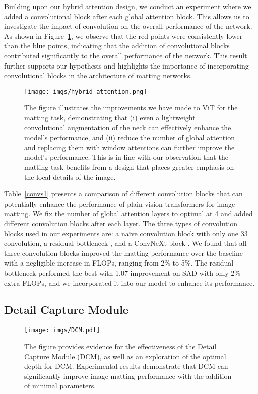 \documentclass[10pt,twocolumn,letterpaper]{article}
\begin{document}
Building upon our hybrid attention design, we conduct an experiment where we added a convolutional block after each global attention block. This allows us to investigate the impact of convolution on the overall performance of the network. As shown in Figure~\ref{fig:hybrid_attention}, we observe that the red points were consistently lower than the blue points, indicating that the addition of convolutional blocks contributed significantly to the overall performance of the network. This result further supports our hypothesis and highlights the importance of incorporating convolutional blocks in the architecture of matting networks.

\begin{figure}
    \centering
    \texttt{[image: imgs/hybrid\_attention.png]}
    \caption{The figure illustrates the improvements we have made to ViT for the matting task, demonstrating that (i) even a lightweight convolutional augmentation of the neck can effectively enhance the model's performance, and (ii) reduce the number of global attention and replacing them with window attentions can further improve the model's performance. This is in line with our observation that the matting task benefits from a design that places greater emphasis on the local details of the image. }
    \label{fig:hybrid_attention}
\end{figure}

Table~\ref{convs1} presents a comparison of different convolution blocks that can potentially enhance the performance of plain vision transformers for image matting. We fix the number of global attention layers to optimal at 4 and added different convolution blocks after each layer. The three types of convolution blocks used in our experiments are: a na\"ive convolution block with only one 33 convolution, a residual bottleneck \cite{res}, and a ConvNeXt block \cite{convnext}. We found that all three convolution blocks improved the matting performance over the baseline with a negligible increase in FLOPs, ranging from 2\% to 5\%. The residual bottleneck performed the best with 1.07 improvement on SAD with only 2\% extra FLOPs, and we incorporated it into our model to enhance its performance.

\subsection{Detail Capture Module}
\label{detail capture module}

\begin{figure}
    \centering
    \texttt{[image: imgs/DCM.pdf]}
    \caption{The figure provides evidence for the effectiveness of the Detail Capture Module (DCM), as well as an exploration of the optimal depth for DCM. Experimental results demonstrate that DCM can significantly improve image matting performance with the addition of minimal parameters.}
    \label{fig:DCM}
\end{figure}
\end{document}
